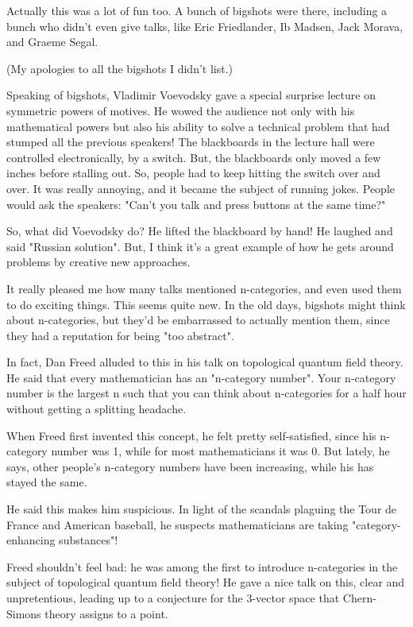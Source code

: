 Actually this was a lot of fun too.  A bunch of bigshots were 
there, including a bunch who didn't even give talks, like Eric
Friedlander, Ib Madsen, Jack Morava, and Graeme Segal.  

(My apologies to all the bigshots I didn't list.)

Speaking of bigshots, Vladimir Voevodsky gave a special surprise 
lecture on symmetric powers of motives.  He wowed the audience not 
only with his mathematical powers but also his ability to solve a 
technical problem that had stumped all the previous speakers!  The 
blackboards in the lecture hall were controlled electronically,
by a switch.  But, the blackboards only moved a few inches before 
stalling out.  So, people had to keep hitting the switch over and 
over.  It was really annoying, and it became the subject of running
jokes.  People would ask the speakers: "Can't you talk and press
buttons at the same time?"

So, what did Voevodsky do?  He lifted the blackboard by hand!  He
laughed and said "Russian solution".  But, I think it's a
great example of how he gets around problems by creative new
approaches.

It really pleased me how many talks mentioned n-categories, and 
even used them to do exciting things.  This seems quite new.  In
the old days, bigshots might think about n-categories, but they'd
be embarrassed to actually mention them, since they had a 
reputation for being "too abstract".

In fact, Dan Freed alluded to this in his talk on topological
quantum field theory.  He said that every mathematician has
an "n-category number".  Your n-category number is the largest n 
such that you can think about n-categories for a half hour without 
getting a splitting headache. 

When Freed first invented this concept, he felt pretty 
self-satisfied, since his n-category number was 1, while for 
most mathematicians it was 0.  But lately, he says, other 
people's n-category numbers have been increasing, while his has 
stayed the same.

He said this makes him suspicious.  In light of the scandals 
plaguing the Tour de France and American baseball, he suspects 
mathematicians are taking "category-enhancing substances"!

Freed shouldn't feel bad: he was among the first to introduce
n-categories in the subject of topological quantum field theory! 
He gave a nice talk on this, clear and unpretentious, leading 
up to a conjecture for the 3-vector space that Chern-Simons 
theory assigns to a point.  


